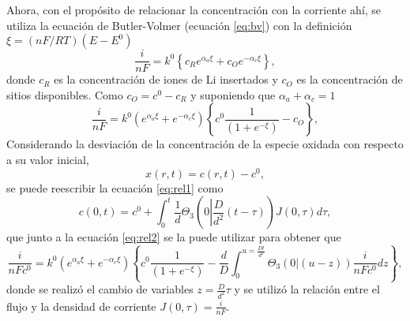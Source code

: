 Ahora, con el propósito de relacionar la concentración con la corriente ahí, se
utiliza la ecuación de Butler-Volmer (ecuación \ref{eq:bv}) con la definición
$\xi = (nF/RT)(E - E^0)$
\begin{equation}
    \frac{i}{nF} = k^0 \left\{ c_R e^{\alpha_a \xi} + c_O e^{-\alpha_c\xi} \right\},
\end{equation}
donde $c_R$ es la concentración de iones de Li insertados y $c_O$ es la 
concentración de sitios disponibles. Como $c_O = c^0 - c_R$ y suponiendo que 
$\alpha_a + \alpha_c = 1$
\begin{equation}\label{eq:rel2}
    \frac{i}{nF} = k^0 (e^{\alpha_a \xi} + e^{-\alpha_c \xi}) \left\{ c^0 \frac{1}{(1 + e^{-\xi})} - c_O \right\},
\end{equation}
Considerando la desviación de la concentración de la especie oxidada con respecto 
a su valor inicial,
\begin{equation}
    x(r, t) = c(r, t) - c^0,
\end{equation}
se puede reescribir la ecuación \ref{eq:rel1} como
\begin{equation}
    c(0, t) = c^0 + \int_0^t \frac{1}{d} \Theta_3\left(0 \left|\frac{D}{d^2} (t - \tau)\right.\right) J(0, \tau) d\tau,
\end{equation}
que junto a la ecuación \ref{eq:rel2} se la puede utilizar para obtener que 
\cite{aoki1984}
\begin{equation}\label{eq:aoki}
    \frac{i}{nFc^0} = k^0 (e^{\alpha_a \xi} + e^{-\alpha_c \xi}) \left\{ c^0 \frac{1}{(1 + e^{-\xi})} - \frac{d}{D} \int_0^{u=\frac{Dt}{d^2}} \Theta_3\left(0 \left| (u - z)\right.\right) \frac{i}{nFc^0} dz \right\},
\end{equation}
donde se realizó el cambio de variables $z = \frac{D}{d^2}\tau$ y se utilizó la 
relación entre el flujo y la densidad de corriente $J(0, \tau) = \frac{i}{nF}$.

